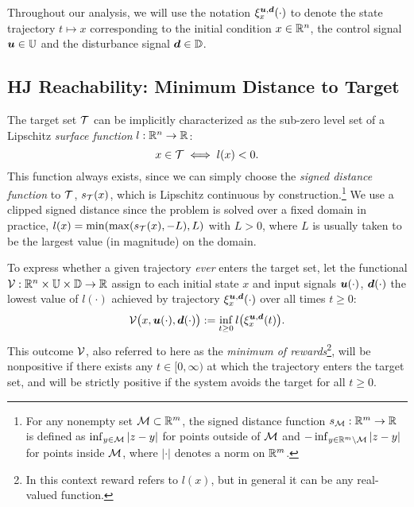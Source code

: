 Throughout our analysis, we will use the notation $\xi_{x}^{\bm{u},\bm{d}}(\cdot)$ to denote the state trajectory $t\mapsto x$ corresponding to the initial condition $x\in\mathbb{R}^n$, the control signal $\bm{u}\in\mathbb{U}$ and the disturbance signal $\bm{d}\in\mathbb{D}$.


\subsection{HJ Reachability: Minimum Distance to Target}
The target set $\mathcal{T}$ can be implicitly characterized as the sub-zero level set of a Lipschitz \emph{surface function} $l:\mathbb{R}^n\rightarrow\mathbb{R}$: 
\begin{equation}\label{eq:l}
x\in\mathcal{T}\iff l(x)<0.
\end{equation}
This function always exists, since we can simply choose the \emph{signed distance function} to $\mathcal{T}$,  $s_{\mathcal{T}}(x)$, which is Lipschitz continuous by construction.\footnote{ For any nonempty set $\mathcal{M}\subset\mathbb{R}^m$, the signed distance function $s_{\mathcal{M}}:\mathbb{R}^m\to\mathbb{R}$  is defined as
$\inf_{y\in\mathcal{M}} |z-y|$ for points outside of $\mathcal{M}$ and $ -\inf_{y\in\mathbb{R}^m\setminus\mathcal{M}} |z-y|$ for points inside $\mathcal{M}$, where $|\cdot|$ denotes a norm on $\mathbb{R}^m$.} We use a clipped signed distance since the problem is solved over a fixed domain in practice, $l(x) = \min(\max(s_{\mathcal{T}}(x), -L), L)$ with $L>0$, where $L$ is usually taken to be the largest value (in magnitude) on the domain.

To express whether a given trajectory \emph{ever} enters the target set, let the functional $\mathcal{V}:\mathbb{R}^n\times\mathbb{U}\times\mathbb{D}\to\mathbb{R}$ assign to each initial state $x$ and input signals $\bm{u}(\cdot)$, $\bm{d}(\cdot)$ the lowest value of $l(\cdot)$ achieved by trajectory $\xi_{x}^{\bm{u}, \bm{d}}(\cdot)$ over all times $t\ge0$: 
\begin{equation}\label{eq:min_dist_functional}
\mathcal{V}\big(x,\bm{u}(\cdot),\bm{d}(\cdot)\big) := \inf_{t\ge 0}l\big(\xi_{x}^{\bm{u},\bm{d}}(t)\big).
\end{equation}
This outcome $\mathcal{V}$, also referred to here as the \emph{minimum of rewards}\footnote{In this context reward refers to $l(x)$, but in general it can be any real-valued function.}, will be nonpositive if there exists any $t\in[0,\infty)$ at which the trajectory enters the target set, and will be strictly positive if the system avoids the target for all $t\ge 0$. 



